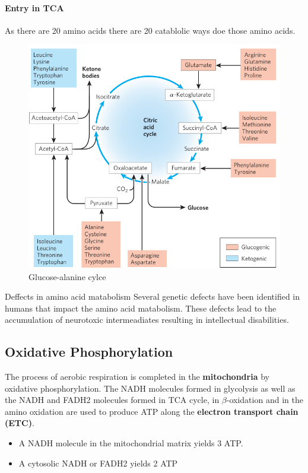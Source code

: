 \documentclass[../main.tex]{subfiles}
\begin{document}
\paragraph{Entry in TCA}
As there are 20 amino acids there are 20 catablolic ways doe those amino acids. 
\begin{figure}[H]
	\centering
	\includegraphics[width = 0.7 \textwidth]{AA2_4}
	\caption{Glucose-alanine cylce}
\end{figure}  

\begin{RemarkWithTitel}{Deffects in amino acid matabolism}
	Several genetic defects have been identified in humans that impact the amino acid matabolism. These defects lead to the accumulation of neurotoxic intermeadiates resulting in intellectual disabilities. 
\end{RemarkWithTitel}


\subsection{Oxidative Phosphorylation}
The process of aerobic respiration is completed in the \textbf{mitochondria} by oxidative phosphorylation. The NADH molecules formed in glycolysis as well as the NADH and FADH2 molecules formed in TCA cycle, in $\beta$-oxidation and in the amino oxidation are used to produce ATP along the \textbf{electron transport chain (ETC)}.

\begin{itemize}
	\item A NADH molecule in the mitochondrial matrix yields 3 ATP. 
	\item A cytosolic NADH or FADH2 yields 2 ATP
\end{itemize}
\end{document}

